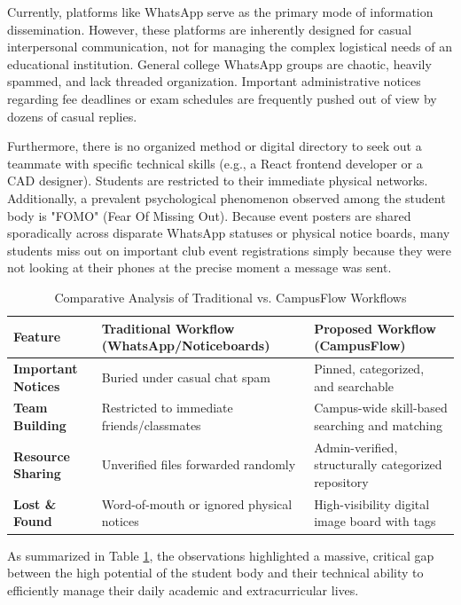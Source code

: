 Currently, platforms like WhatsApp serve as the primary mode of information dissemination. However, these platforms are inherently designed for casual interpersonal communication, not for managing the complex logistical needs of an educational institution. General college WhatsApp groups are chaotic, heavily spammed, and lack threaded organization. Important administrative notices regarding fee deadlines or exam schedules are frequently pushed out of view by dozens of casual replies.

Furthermore, there is no organized method or digital directory to seek out a teammate with specific technical skills (e.g., a React frontend developer or a CAD designer). Students are restricted to their immediate physical networks. Additionally, a prevalent psychological phenomenon observed among the student body is "FOMO" (Fear Of Missing Out). Because event posters are shared sporadically across disparate WhatsApp statuses or physical notice boards, many students miss out on important club event registrations simply because they were not looking at their phones at the precise moment a message was sent.

\begin{table}[htbp]
\centering
\renewcommand{\arraystretch}{1.5}
\begin{tabular}{|p{}|p{}|p{}|}
\hline
\textbf{Feature} & \textbf{Traditional Workflow (WhatsApp/Noticeboards)} & \textbf{Proposed Workflow (CampusFlow)} \\ \hline
\textbf{Important Notices} & Buried under casual chat spam & Pinned, categorized, and searchable \\ \hline
\textbf{Team Building} & Restricted to immediate friends/classmates & Campus-wide skill-based searching and matching \\ \hline
\textbf{Resource Sharing} & Unverified files forwarded randomly & Admin-verified, structurally categorized repository \\ \hline
\textbf{Lost \& Found} & Word-of-mouth or ignored physical notices & High-visibility digital image board with tags \\ \hline
\end{tabular}
\caption{Comparative Analysis of Traditional vs. CampusFlow Workflows}
\label{tab:workflow_comparison}
\end{table}

As summarized in Table \ref{tab:workflow_comparison}, the observations highlighted a massive, critical gap between the high potential of the student body and their technical ability to efficiently manage their daily academic and extracurricular lives.